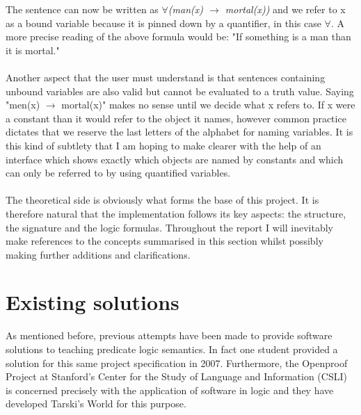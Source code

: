 \documentclass{report}
\begin{document}
\noindent The sentence can now be written as
\emph{$\forall$(man(x) $\rightarrow$ mortal(x))}
and we refer to x as a bound variable because it is pinned down by a quantifier,
in this case $\forall$. A more precise reading of the above formula would be:
"If something is a man than it is mortal." 
\\ \\
Another aspect that the user must understand is that sentences containing 
unbound variables are also valid but cannot be evaluated to a truth value. 
Saying "men(x) $\rightarrow$ mortal(x)" makes no sense until we decide what x 
refers to. If x were a constant than it would refer to the object it names, 
however common practice dictates that we reserve the last letters of the 
alphabet for naming variables. It is this kind of subtlety that I am hoping
to make clearer with the help of an interface which shows exactly which objects
are named by constants and which can only be referred to by using quantified 
variables. 
\\ \\
The theoretical side is obviously what forms the base of this project. It is 
therefore natural that the implementation follows its key aspects: the 
structure, the signature and the logic formulas. Throughout the report I will 
inevitably make references to the concepts summarised in this section whilst 
possibly making further additions and clarifications.

\section{Existing solutions}
As mentioned before, previous attempts have been made to provide software 
solutions to teaching predicate logic semantics. In fact one student provided a 
solution for this same project specification in 2007. Furthermore, the Openproof
Project at Stanford's Center for the Study of Language and Information (CSLI) 
is concerned precisely with the application of software in logic and they have 
developed Tarski's World for this purpose.
\end{document}
